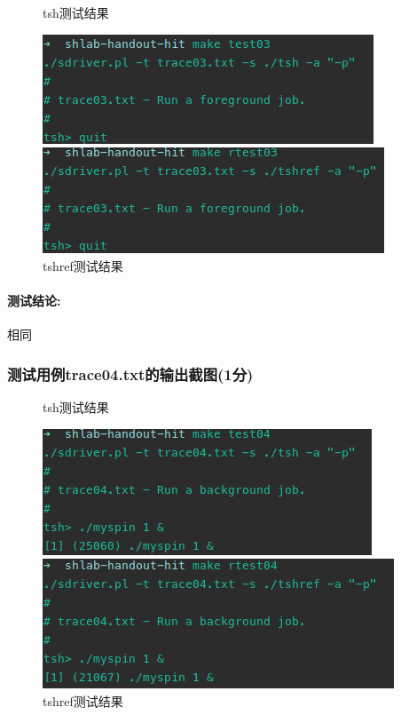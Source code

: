\begin{figure}[H]
    \begin{minipage}[c]{0.5\linewidth}
        \centering
        \caption{tsh测试结果}
        \includegraphics[width=0.7\linewidth]{figures/test03.png}
    \end{minipage}
    \begin{minipage}[c]{0.5\linewidth}
        \centering
        \caption{tshref测试结果}
        \includegraphics[width=0.7\linewidth]{figures/rtest03.png}
    \end{minipage}
\end{figure}

\paragraph{测试结论:}相同

\subsubsection{测试用例trace04.txt的输出截图(1分)}

\begin{figure}[H]
    \begin{minipage}[c]{0.5\linewidth}
        \centering
        \caption{tsh测试结果}
        \includegraphics[width=0.7\linewidth]{figures/test04.png}
    \end{minipage}
    \begin{minipage}[c]{0.5\linewidth}
        \centering
        \caption{tshref测试结果}
        \includegraphics[width=0.7\linewidth]{figures/rtest04.png}
    \end{minipage}
\end{figure}

